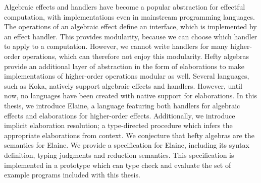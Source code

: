 \noindent
Algebraic effects and handlers have become a popular abstraction for effectful computation, with implementations even in mainstream programming languages.
%
%
The operations of an algebraic effect define an interface, which is implemented by an effect handler.
%
This provides modularity, because we can choose which handler to apply to a computation.
%
However, we cannot write handlers for many higher-order operations, which can therefore not enjoy this modularity.
%
Hefty algebras provide an additional layer of abstraction in the form of elaborations to make implementations of higher-order operations modular as well.
%
Several languages, such as Koka, natively support algebraic effects and handlers.
%
However, until now, no languages have been created with native support for elaborations.
%
In this thesis, we introduce Elaine, a language featuring both handlers for algebraic effects and elaborations for higher-order effects.
%
Additionally, we introduce implicit elaboration resolution; a type-directed procedure which infers the appropriate elaborations from context.
%
We conjecture that hefty algebras are the semantics for Elaine.
%
We provide a specification for Elaine, including its syntax definition, typing judgments and reduction semantics.
%
This specification is implemented in a prototype which can type check and evaluate the set of example programs included with this thesis.
%
